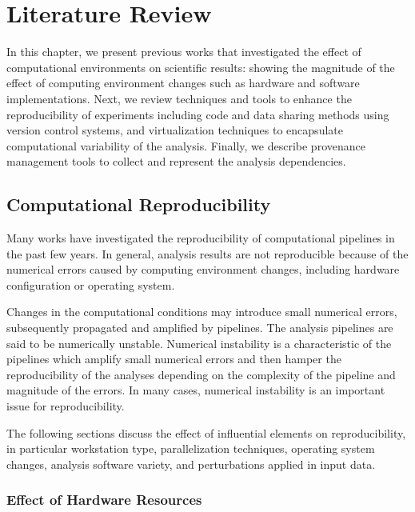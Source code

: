 \chapter{Literature Review}
\label{ch:background}

In this chapter, we present previous works that investigated the effect of 
computational environments on scientific results:
showing the magnitude of the effect of computing environment changes such 
as hardware and software implementations. Next, we review 
techniques and tools to enhance the reproducibility of experiments 
including code and data sharing methods using version control 
systems, and virtualization techniques to encapsulate computational 
variability of the analysis. 
Finally, we describe provenance management tools
to collect and represent the analysis dependencies. 


\section{Computational Reproducibility}

Many works have investigated the reproducibility of computational
pipelines in the past few years. In general, analysis results are not reproducible
because of the numerical errors caused by computing environment changes,
including hardware configuration or operating system. 

Changes in the computational conditions may introduce small numerical 
errors, subsequently propagated and amplified by pipelines.
The analysis pipelines are said to be numerically unstable. 
Numerical instability is a characteristic of the pipelines which 
amplify small numerical errors and then hamper the reproducibility 
of the analyses depending on the complexity of the pipeline and magnitude 
of the errors. In many cases, numerical instability is an important 
issue for reproducibility. 

The following sections discuss the effect of influential elements on 
reproducibility, in particular workstation type, parallelization techniques, 
operating system changes, analysis software variety, and perturbations 
applied in input data. 

\subsection{Effect of Hardware Resources}

